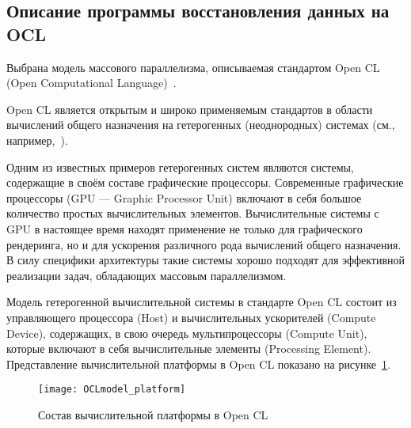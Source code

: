 

\label{sec:OCLprog}


\subsection*{Описание программы восстановления данных на OCL}


Выбрана модель массового параллелизма,
описываемая стандартом Open CL (Open Computational Language)~\cite{doc_OCL}.

Open CL является открытым и широко применяемым стандартов в области вычислений
общего назначения на гетерогенных (неоднородных) системах
(см., например,~\cite{paper_OCL_Komdiv}). %

Одним из известных примеров гетерогенных систем являются системы,
содержащие в своём составе графические процессоры.
Современные графические процессоры (GPU --- Graphic Processor Unit)
включают в себя большое количество простых 
вычислительных элементов. %
Вычислительные системы с GPU в настоящее время находят применение не только для
графического рендеринга, но и для ускорения различного рода
вычислений общего назначения. 
В силу специфики архитектуры такие системы 
хорошо подходят для эффективной реализации задач,
обладающих массовым параллелизмом.


Модель гетерогенной вычислительной системы в стандарте Open CL 
состоит из управляющего процессора (Host)
и вычислительных ускорителей (Compute Device),
содержащих, в свою очередь 
мультипроцессоры (Compute Unit),
которые включают в себя вычислительные элементы (Processing Element).
Представление вычислительной платформы в Open CL
показано на рисунке~\ref{fig:OCL_platform}.

\begin{figure}[h!]
  \centering
  \texttt{[image: OCLmodel\_platform]} 
  \caption{Состав вычислительной платформы в Open CL}
  \label{fig:OCL_platform}
\end{figure}
\FloatBarrier


